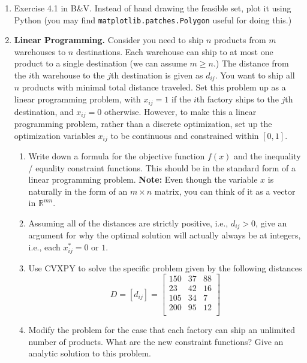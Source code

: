 \documentclass[11pt]{article}
\begin{document}
\begin{enumerate}

\item Exercise 4.1 in B\&V. Instead of hand drawing the feasible set, plot it
  using Python (you may find {\tt matplotlib.patches.Polygon} useful for doing
  this.)

\item {\bf Linear Programming.} Consider you need to ship $n$ products from $m$
  warehouses to $n$ destinations. Each warehouse can ship to at most one product
  to a single destination (we can assume $m \geq n$.) The distance from the
  $i$th warehouse to the $j$th destination is given as $d_{ij}$. You want to
  ship all $n$ products with minimal total distance traveled. Set this problem
  up as a linear programming problem, with $x_{ij} = 1$ if the $i$th factory
  ships to the $j$th destination, and $x_{ij} = 0$ otherwise. However, to make
  this a linear programming problem, rather than a discrete optimization, set up
  the optimization variables $x_{ij}$ to be continuous and constrained within
  $[0, 1]$.
  \begin{enumerate}
  \item Write down a formula for the objective function $f(x)$ and the
    inequality / equality constraint functions. This should be in the standard
    form of a linear programming problem. {\bf Note:} Even though the variable
    $x$ is naturally in the form of an $m \times n$ matrix, you can think of it
    as a vector in $\mathbb{R}^{mn}$.

  \item Assuming all of the distances are strictly positive, i.e., $d_{ij} > 0$,
    give an argument for why the optimal solution will actually always be at
    integers, i.e., each $x_{ij}^* = 0$ or $1$.

  \item Use CVXPY to solve the specific problem given by the following distances
    $$
    D = [d_{ij}] = 
    \begin{bmatrix}
      150 & 37 & 88\\
      23 & 42 & 16\\
      105 & 34 & 7\\
      200 & 95 & 12\\
    \end{bmatrix}
    $$

  \item Modify the problem for the case that each factory can ship an unlimited
    number of products. What are the new constraint functions?  Give an analytic
    solution to this problem.


\end{enumerate}
\end{enumerate}
\end{document}
